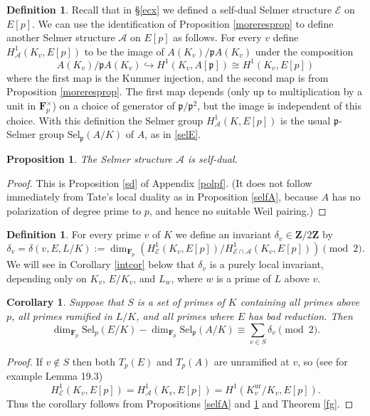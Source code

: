 \documentclass[reqno]{amsart}
\newtheorem{cor}[thm]{Corollary}
\newtheorem{prop}[thm]{Proposition}
\theoremstyle{definition}
\newtheorem{defn}[thm]{Definition}
\def\Z{\mathbf{Z}}
\def\F{\mathbf{F}}
\def\Fp{\F_p}
\def\A{\mathcal{A}}
\def\E{\mathcal{E}}
\def\P{\mathfrak{p}}
\def\unr{\mathrm{ur}}
\def\Sel{\mathrm{Sel}}
\def\hookto{\hookrightarrow}
\def\Hs#1{H^1_{#1}}
\def\HE{\Hs{\E}}
\def\HA{\Hs{\A}}
\def\rf{\Fp}
\begin{document}
\begin{defn}
\label{bdef}
Recall that in \S\ref{ecx} we defined a self-dual Selmer structure $\E$ on $E[p]$.  
We can use the identification of Proposition \ref{moreresprop} 
to define another Selmer structure $\A$ on $E[p]$ as follows.  
For every $v$ define 
$\HA(K_v,E[p])$ to be the image of $A(K_v)/\P A(K_v)$ under the 
composition
\begin{equation*}
\label{locA}
A(K_v)/\P A(K_v) \hookto H^1(K_v,A[\P]) \cong H^1(K_v,E[p])
\end{equation*}
where the first map is the Kummer injection, 
and the second map is from Proposition \ref{moreresprop}.  
The first map depends (only up to multiplication by a unit in $\Fp^\times$) 
on a choice of generator of $\P/\P^2$, 
but the image is independent of this choice.  
With this definition the Selmer group $\HA(K,E[p])$ is 
the usual $\P$-Selmer group $\Sel_\P(A/K)$ of $A$, as in \eqref{selE}.
\end{defn}

\begin{prop}
\label{selfB}
The Selmer structure $\A$ is self-dual.
\end{prop}

\begin{proof}
This is Proposition \ref{sd} of Appendix \ref{polpf}.  
(It does not follow immediately from Tate's local duality 
as in Proposition \ref{selfA}, because $A$ has no polarization 
of degree prime to $p$, and hence no suitable Weil pairing.)
\end{proof}

\begin{defn}
\label{deltadef}
For every prime $v$ of $K$ we define an invariant $\delta_v \in \Z/2\Z$ by 
$$
\delta_v = \delta(v,E,L/K) 
    := \dim_{\rf}(\HE(K_v,E[p])/\Hs{\E\cap\A}(K_v,E[p])) \pmod{2}.
$$
We will see in Corollary \ref{intcor} below that $\delta_v$ is a purely 
local invariant, depending only on $K_v$, $E/K_v$, and $L_w$, where $w$ is a 
prime of $L$ above $v$.
\end{defn}

\begin{cor}
\label{rkdif1}
Suppose that $S$ is a set of primes of $K$ containing all primes above $p$, 
all primes ramified in $L/K$, and all primes where $E$ has bad 
reduction.  Then
$$
\dim_{\rf}\Sel_p(E/K) - \dim_{\rf}\Sel_\P(A/K) 
   \equiv \sum_{v \in S} \delta_v \pmod{2}.
$$
\end{cor}

\begin{proof}
If $v \notin S$ then both $T_p(E)$ and $T_p(A)$ are unramified at $v$, 
so (see for example \cite{casexp} Lemma 19.3) 
$$
\HE(K_v,E[p]) = \HA(K_v,E[p]) = H^1(K_v^\unr/K_v,E[p]). 
$$
Thus the corollary follows from Propositions \ref{selfA} and \ref{selfB}  
and Theorem \ref{fg}.
\end{proof}
\end{document}
